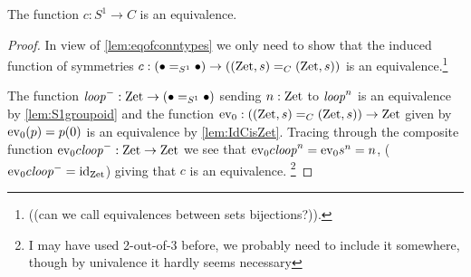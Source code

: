 \begin{theorem}\label{thm:S1bysymmetries}
  The function $c:S^1\to C$ is an equivalence.
\end{theorem}
\begin{proof}
  In view of \cref{lem:eqofconntypes} we only need to show that the induced function of symmetries $c:(\bullet=_{S^1}\bullet)\to((\mathrm{Zet},s)=_C(\mathrm{Zet},s))$ is an equivalence.\footnote{ ((can we call equivalences between sets bijections?)).}  

The function $\mathit{loop}^-:\mathrm{Zet}\to (\bullet=_{S^1}\bullet)$ sending $n:\mathrm{Zet}$ to $\mathit{loop}^n$ is an equivalence by  \cref{lem:S1groupoid} and the function  $\mathrm{ev}_0:((\mathrm{Zet},s)=_C(\mathrm{Zet},s))\to \mathrm{Zet}$ given by $\mathrm{ev}_0(p)=p(0)$ is an equivalence by \cref{lem:IdCisZet}.  Tracing through the composite function $\mathrm{ev}_0c\mathit{loop}^-:\mathrm{Zet}\to\mathrm{Zet}$ we see that $\mathrm{ev}_0c\mathit{loop}^n=\mathrm{ev}_0s^n=n$, (\ie $\mathrm{ev}_0c\mathit{loop}^-=\mathord{\mathrm{id}}_{\mathrm{Zet}}$) giving that $c$ is an equivalence. 
\footnote{I may have used 2-out-of-3 before, we probably need to include it somewhere, though by univalence it hardly seems necessary}%
\end{proof}




